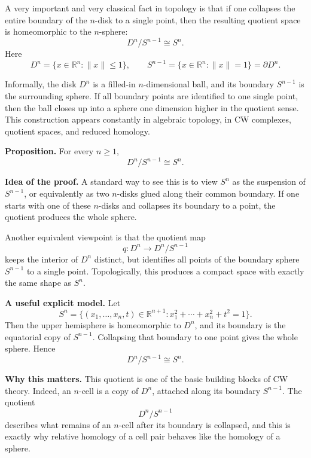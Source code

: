 \documentclass[12pt,a4paper]{article}
\theoremstyle{notespace}
\begin{document}
A very important and very classical fact in topology is that if one collapses the entire boundary of the \(n\)-disk to a single point, then the resulting quotient space is homeomorphic to the \(n\)-sphere:
\[
D^n/S^{n-1}\cong S^n.
\]
Here
\[
D^n=\{x\in \mathbb R^n:\|x\|\le 1\},
\qquad
S^{n-1}=\{x\in \mathbb R^n:\|x\|=1\}=\partial D^n.
\]

Informally, the disk \(D^n\) is a filled-in \(n\)-dimensional ball, and its boundary \(S^{n-1}\) is the surrounding sphere. If all boundary points are identified to one single point, then the ball closes up into a sphere one dimension higher in the quotient sense. This construction appears constantly in algebraic topology, in CW complexes, quotient spaces, and reduced homology.

\medskip

\noindent
\textbf{Proposition.}
For every \(n\ge 1\),
\[
D^n/S^{n-1}\cong S^n.
\]

\medskip

\noindent
\textbf{Idea of the proof.}
A standard way to see this is to view \(S^n\) as the suspension of \(S^{n-1}\), or equivalently as two \(n\)-disks glued along their common boundary. If one starts with one of these \(n\)-disks and collapses its boundary to a point, the quotient produces the whole sphere.

Another equivalent viewpoint is that the quotient map
\[
q:D^n\to D^n/S^{n-1}
\]
keeps the interior of \(D^n\) distinct, but identifies all points of the boundary sphere \(S^{n-1}\) to a single point. Topologically, this produces a compact space with exactly the same shape as \(S^n\).

\medskip

\noindent
\textbf{A useful explicit model.}
Let
\[
S^n=\{(x_1,\dots,x_n,t)\in \mathbb R^{n+1}:x_1^2+\cdots+x_n^2+t^2=1\}.
\]
Then the upper hemisphere is homeomorphic to \(D^n\), and its boundary is the equatorial copy of \(S^{n-1}\). Collapsing that boundary to one point gives the whole sphere. Hence
\[
D^n/S^{n-1}\cong S^n.
\]

\medskip

\noindent
\textbf{Why this matters.}
This quotient is one of the basic building blocks of CW theory. Indeed, an \(n\)-cell is a copy of \(D^n\), attached along its boundary \(S^{n-1}\). The quotient
\[
D^n/S^{n-1}
\]
describes what remains of an \(n\)-cell after its boundary is collapsed, and this is exactly why relative homology of a cell pair behaves like the homology of a sphere.
\end{document}
